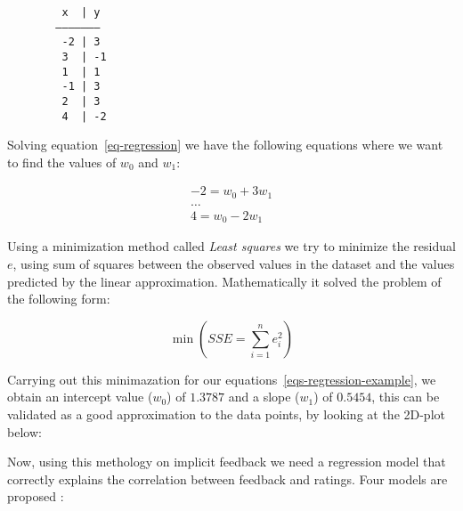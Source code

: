 \begin{figure}[H]
  \centering
  \begin{BVerbatim}
   x  | y  
  ———————
   -2 | 3
   3  | -1
   1  | 1
   -1 | 3
   2  | 3
   4  | -2
  \end{BVerbatim}
\end{figure}

Solving equation~\ref{eq-regression} we have the following equations where we
want to find the values of $w_0$ and $w_1$:

\begin{equation}
  \label{eqs-regression-example}
  \begin{split}
    -2 = w_0 + 3 w_1 \\
    \dots \\
    4 = w_0 - 2 w_1
  \end{split}
\end{equation}


Using a minimization method called \textit{Least squares} we try to minimize
the residual $e$, using sum of squares between the observed values in the
dataset and the values predicted by the linear approximation. Mathematically it
solved the problem of the following form:

\begin{equation}
  \min (SSE = \sum_{i=1}^{n} e_i^2)
\end{equation}

Carrying out this minimazation for our equations~\ref{eqs-regression-example},
we obtain an intercept value ($w_0$) of $1.3787$ and a slope ($w_1$) of
$0.5454$, this can be validated as a good approximation to the data points, by
looking at the 2D-plot below:

\begin{figure}[H]
  \centering
\end{figure}

Now, using this methology on implicit feedback we need a regression model that
correctly explains the correlation between feedback and ratings. Four models
are proposed :

